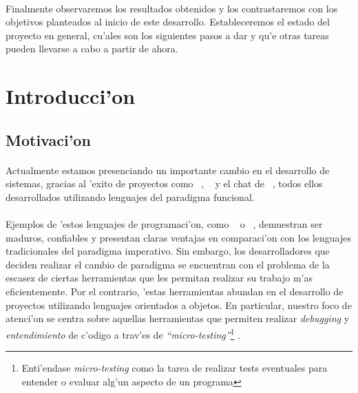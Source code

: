\documentclass[a4paper]{article}
\begin{document}
\paragraph{}Finalmente observaremos los resultados obtenidos y los contrastaremos con los objetivos planteados al inicio de este desarrollo.  Estableceremos el estado del proyecto en general, cu'ales son los siguientes pasos a dar y qu'e otras tareas pueden llevarse a cabo a partir de ahora.

\newpage
\section{Introducci'on}
\subsection{Motivaci'on}
\begin{epigraphs}
\end{epigraphs}
\paragraph{}Actualmente estamos presenciando un importante cambio en el desarrollo de sistemas, gracias al 'exito de proyectos como ~\cite{couchdb}, ~\cite{ejabberd} y el chat de ~\cite{facebook}, todos ellos desarrollados utilizando lenguajes del paradigma funcional.
\paragraph{}Ejemplos de 'estos lenguajes de programaci'on, como ~\cite{haskell} o ~\cite{erlang}, demuestran ser maduros, confiables y presentan claras ventajas en comparaci'on con los lenguajes tradicionales del paradigma imperativo.  Sin embargo, los desarrolladores que deciden realizar el cambio de paradigma se encuentran con el problema de la escasez de ciertas herramientas que les permitan realizar su trabajo m'as eficientemente.  Por el contrario, 'estas herramientas abundan en el desarrollo de proyectos utilizando lenguajes orientados a objetos.  En particular, nuestro foco de atenci'on se centra sobre aquellas herramientas que permiten realizar \textsl{debugging} y \textsl{entendimiento} de c'odigo a trav'es de \textsl{``micro-testing''}\footnote{Enti'endase \textsl{micro-testing} como la tarea de realizar tests eventuales para entender o evaluar alg'un aspecto de un programa} .
\end{document}
